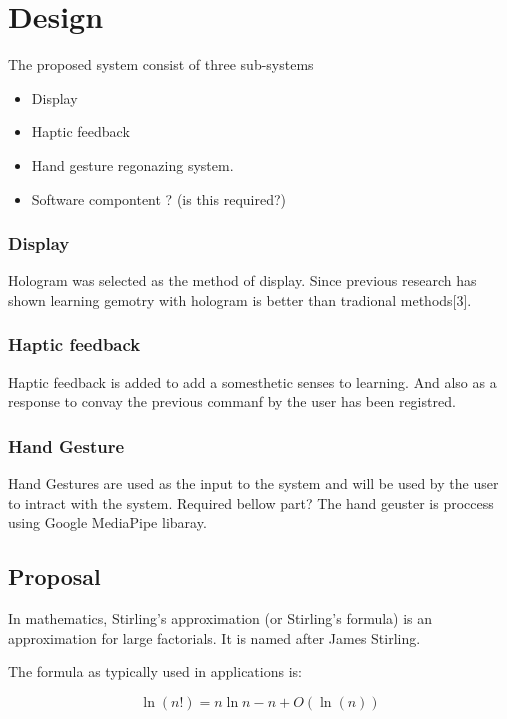 \documentclass{fisatproject}
\begin{document}
\chapter{Design}

The proposed system consist of three sub-systems
\begin{itemize}
    \item  Display
    \item Haptic feedback
    \item Hand gesture regonazing system.
    \item Software compontent ? (is this required?)
\end{itemize}
\subsection{Display}
Hologram was selected as the method of display. Since previous  research has shown learning gemotry with hologram is better than tradional methods[3].

\subsection{Haptic feedback}
Haptic feedback is added to add a somesthetic senses to learning. And also as a response to convay the previous commanf by the user has been registred.

\subsection{Hand Gesture}
Hand Gestures are used as the input to the system and will be used by the user to intract with the system.
{Required bellow part?}
The hand geuster is proccess using Google  MediaPipe libaray.

\section{Proposal}
In mathematics, Stirling's approximation (or Stirling's formula) is an approximation for large factorials. It is named after James Stirling.

The formula as typically used in applications is:

$$
\ln (n!) = n \ln n - n  + O(\ln(n))
$$
\end{document}
